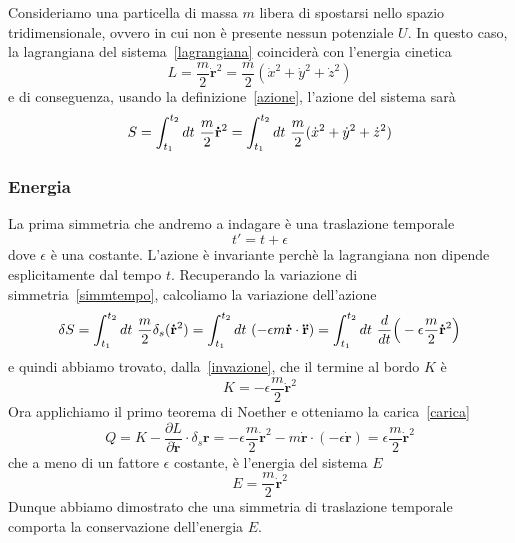     \begin{example}
        Consideriamo una particella di massa $m$ libera di spostarsi nello spazio tridimensionale, ovvero in cui non è presente nessun potenziale $U$. In questo caso, la lagrangiana del sistema~\eqref{lagrangiana} coinciderà con l'energia cinetica 
    \begin{equation} \label{lag2}
        L = \frac{m}{2} \mathbf{\dot r}^2 = \frac{m}{2} (\dot x^2 + \dot y^2 + \dot z^2)
    \end{equation}
        e di conseguenza, usando la definizione~\eqref{azione}, l'azione del sistema sarà
    \begin{equation}
        S = \int_{t_1}^{t_2}dt~ \frac{m}{2} \mathbf{\dot r}^2 = \int_{t_1}^{t_2}dt~ \frac{m}{2} (\dot x^2 + \dot y^2 + \dot z^2)
    \end{equation}

    \subsubsection{Energia}
        La prima simmetria che andremo a indagare è una traslazione temporale
    \begin{equation}
        t' = t + \epsilon
    \end{equation}
        dove $\epsilon$ è una costante. L'azione è invariante perchè la lagrangiana non dipende esplicitamente dal tempo $t$. Recuperando la variazione di simmetria~\eqref{simmtempo}, calcoliamo la variazione dell'azione
    \begin{equation}
        \delta S = \int_{t_1}^{t_2}dt~ \frac{m}{2} \delta_s ( \mathbf{\dot r}^2) = \int_{t_1}^{t_2}dt~ ( - \epsilon m  \mathbf{\dot r} \cdot \mathbf{\ddot r}) = \int_{t_1}^{t_2}dt~ \frac{d}{dt} \Big( -\epsilon \frac{m}{2}  \mathbf{\dot r}^2 \Big)
    \end{equation}
        e quindi abbiamo trovato, dalla~\eqref{invazione}, che il termine al bordo $K$ è 
    \begin{equation*}
        K = - \epsilon \frac{m}{2} \mathbf{\dot r}^2
    \end{equation*}
        Ora applichiamo il primo teorema di Noether e otteniamo la carica~\eqref{carica} 
    \begin{equation}
        Q = K - \frac{\partial L}{\partial  \mathbf{\dot r}} \cdot \delta_s  \mathbf r = - \epsilon \frac{m}{2} \mathbf{\dot r}^2 - m \mathbf{\dot r} \cdot (-\epsilon \mathbf{\dot r}) = \epsilon \frac{m}{2} \mathbf{\dot r}^2
    \end{equation}
        che a meno di un fattore $\epsilon$ costante, è l'energia del sistema $E$
    \begin{equation*}
        E = \frac{m}{2} \mathbf{\dot r}^2
    \end{equation*}
        Dunque abbiamo dimostrato che una simmetria di traslazione temporale comporta la conservazione dell'energia $E$.


\end{example}
